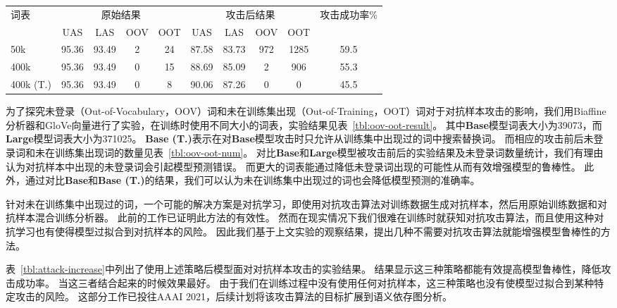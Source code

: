 \begin{table}[ht]
    \vspace{0.5em}\centering\wuhao
	\begin{tabular}{lccccccccc}
		\toprule[1.5pt]
		\multirow{2}{*}{词表}& \multicolumn{4}{c}{原始结果} & \multicolumn{4}{c}{攻击后结果} & \multirow{2}{*}{攻击成功率\%} \\
		\cmidrule(r){2-5} \cmidrule(r){6-9}
		&UAS &LAS &OOV &OOT &UAS &LAS &OOV &OOT \\
		\midrule[1pt]
		50k  &95.36 &93.49 &2  &24 &87.58 &83.73 &972 &1285 &59.5 \\
		400k &95.36 &93.49 &0  &15 &88.69 &85.09 &2       &906  &55.3 \\
		400k (T.) &95.36 &93.49 &0  &8  &90.06 &87.26 &0 &0 &45.5 \\
		\bottomrule[1.5pt]
	\end{tabular}
\end{table}


为了探究未登录（Out-of-Vocabulary，OOV）词和未在训练集出现（Out-of-Training，OOT）词对于对抗样本攻击的影响，我们用Biaffine分析器和GloVe向量进行了实验，在训练时使用不同大小的词表，实验结果见表~\ref{tbl:oov-oot-result}。
其中\textbf{Base}模型词表大小为39073，而\textbf{Large}模型词表大小为371025。
\textbf{Base (T.)}表示在对\textbf{Base}模型攻击时只允许从训练集中出现过的词中搜索替换词。
而相应的攻击前后未登录词和未在训练集出现词的数量见表~\ref{tbl:oov-oot-num}。
对比\textbf{Base}和\textbf{Large}模型被攻击前后的实验结果及未登录词数量统计，我们有理由认为对抗样本中出现的未登录词会引起模型预测错误。
而更大的词表能通过降低未登录词出现的可能性从而有效增强模型的鲁棒性。
此外，通过对比\textbf{Base}和\textbf{Base (T.)}的结果，我们可以认为未在训练集中出现过的词也会降低模型预测的准确率。

针对未在训练集中出现过的词，一个可能的解决方案是对抗学习，即使用对抗攻击算法对训练数据生成对抗样本，然后用原始训练数据和对抗样本混合训练分析器。
此前的工作\cite{zheng2020evaluating}已证明此方法的有效性。
然而在现实情况下我们很难在训练时就获知对抗攻击算法，而且使用这种对抗学习也有使得模型过拟合到对抗样本的风险。
因此我们基于上文实验的观察结果，提出几种不需要对抗攻击算法就能增强模型鲁棒性的方法。

表~\ref{tbl:attack-increase}中列出了使用上述策略后模型面对对抗样本攻击的实验结果。
结果显示这三种策略都能有效提高模型鲁棒性，降低攻击成功率。
当这三者结合起来的时候效果最好。
由于我们在训练过程中没有使用任何对抗样本，这三种策略也没有使模型过拟合到某种特定攻击的风险。
这部分工作已投往AAAI 2021，后续计划将该攻击算法的目标扩展到语义依存图分析。


